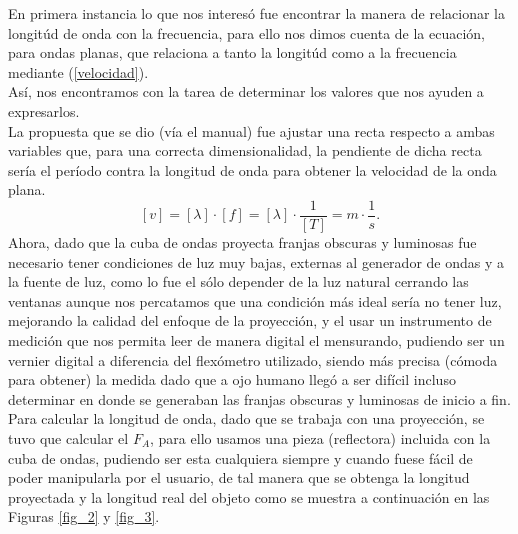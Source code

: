 \documentclass[12pt,a4paper]{article}
\begin{document}
En primera instancia lo que nos interesó fue encontrar la manera de relacionar la longitúd de onda con la frecuencia, para ello nos dimos cuenta de la ecuación, para ondas planas, que relaciona a tanto la longitúd como a la frecuencia mediante (\ref{velocidad}). \\[2mm]
Así, nos encontramos con la tarea de determinar los valores que nos ayuden a expresarlos. \\[2mm]
La propuesta que se dio (vía el manual) fue ajustar una recta respecto a ambas variables que, para una correcta dimensionalidad, la pendiente de dicha recta sería el período contra la longitud de onda para obtener la velocidad de la onda plana.
\[
	[v] = [\lambda] \cdot [f] = [\lambda] \cdot \dfrac{1}{[T]} = m \cdot \dfrac{1}{s} \mbox{.}
\]
Ahora, dado que la cuba de ondas proyecta franjas obscuras y luminosas fue necesario tener condiciones de luz muy bajas, externas al generador de ondas y a la fuente de luz,  como lo fue el sólo depender de la luz natural cerrando las ventanas aunque nos percatamos que una condición más ideal sería no tener luz, mejorando la calidad del enfoque de la proyección, y el usar un instrumento de medición que nos permita leer de manera digital el mensurando, pudiendo ser un vernier digital a diferencia del flexómetro utilizado,  siendo más precisa (cómoda para obtener) la medida dado que a ojo humano llegó a ser difícil incluso determinar en donde se generaban las franjas obscuras y luminosas de inicio a fin. \\[2mm]
Para calcular la longitud de onda, dado que se trabaja con una proyección, se tuvo que calcular el $F_A$, para ello usamos una pieza (reflectora) incluida con la cuba de ondas, pudiendo ser esta cualquiera siempre y cuando fuese fácil de poder manipularla por el usuario, de tal manera que se obtenga la longitud proyectada y la longitud real del objeto como se muestra a continuación en las Figuras \ref{fig_2} y \ref{fig_3}.
\end{document}
